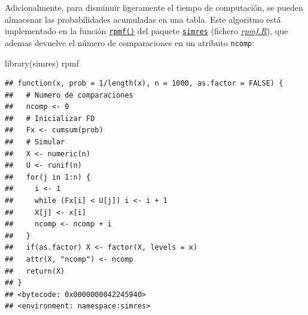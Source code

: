 \documentclass[
]{book}
\newenvironment{Shaded}{\begin{snugshade}}{\end{snugshade}}
\newcommand{\FunctionTok}[1]{\textcolor[rgb]{0.00,0.00,0.00}{#1}}
\newcommand{\NormalTok}[1]{#1}
\theoremstyle{break}
\theoremstyle{nonumberplain}
\begin{document}
Adicionalmente, para disminuir ligeramente el tiempo de computación, se pueden almacenar las probabilidades acumuladas en una tabla.
Este algoritmo está implementado en la función \href{https://rubenfcasal.github.io/simres/reference/rpmf.html}{\texttt{rpmf()}} del paquete \href{https://rubenfcasal.github.io/simres}{\texttt{simres}} (fichero \href{R/rpmf.R}{\emph{rpmf.R}}), que ademas devuelve el número de comparaciones en un atributo \texttt{ncomp}:

\begin{Shaded}
\begin{Highlighting}[]
\FunctionTok{library}\NormalTok{(simres)}
\NormalTok{rpmf}
\end{Highlighting}
\end{Shaded}

\begin{verbatim}
## function(x, prob = 1/length(x), n = 1000, as.factor = FALSE) {
##   # Numero de comparaciones
##   ncomp <- 0
##   # Inicializar FD
##   Fx <- cumsum(prob)
##   # Simular
##   X <- numeric(n)
##   U <- runif(n)
##   for(j in 1:n) {
##     i <- 1
##     while (Fx[i] < U[j]) i <- i + 1
##     X[j] <- x[i]
##     ncomp <- ncomp + i
##   }
##   if(as.factor) X <- factor(X, levels = x)
##   attr(X, "ncomp") <- ncomp
##   return(X)
## }
## <bytecode: 0x0000000042245940>
## <environment: namespace:simres>
\end{verbatim}
\end{document}
